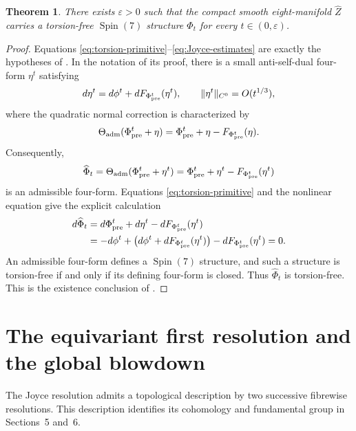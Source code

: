 \documentclass[11pt]{article}
\newtheorem{theorem}{Theorem}[section]
\theoremstyle{remark}\newtheorem{remark}[theorem]{Remark}
\newcommand{\SpinSeven}{\operatorname{Spin}(7)}
\begin{document}
\begin{theorem}\label{thm:Joyce-existence}
There exists $\varepsilon>0$ such that the compact smooth eight-manifold
$\widehat Z$ carries a torsion-free $\SpinSeven$ structure
$\widehat\Phi_t$ for every $t\in(0,\varepsilon)$.
\end{theorem}
\begin{proof}
Equations \eqref{eq:torsion-primitive}--\eqref{eq:Joyce-estimates} are
exactly the hypotheses of \cite[Theorem 13.6.1]{JoyceBook}.  In the notation
of its proof, there is a small anti-self-dual four-form $\eta^t$ satisfying
\[
 d\eta^t=d\phi^t+dF_{\Phi_{\rm pre}^t}(\eta^t),
 \qquad \|\eta^t\|_{C^0}=O(t^{1/3}),
\]
where the quadratic normal correction is characterized by
\[
 \Theta_{\rm adm}(\Phi_{\rm pre}^t+\eta)
 =\Phi_{\rm pre}^t+\eta-F_{\Phi_{\rm pre}^t}(\eta).
\]
Consequently,
\[
 \widehat\Phi_t=
 \Theta_{\rm adm}(\Phi_{\rm pre}^t+\eta^t)
 =\Phi_{\rm pre}^t+\eta^t-F_{\Phi_{\rm pre}^t}(\eta^t)
\]
is an admissible four-form.  Equations
\eqref{eq:torsion-primitive} and the nonlinear equation give the explicit
calculation
\begin{align*}
d\widehat\Phi_t
 &=d\Phi_{\rm pre}^t+d\eta^t
   -dF_{\Phi_{\rm pre}^t}(\eta^t)\\
 &=-d\phi^t+
   \bigl(d\phi^t+dF_{\Phi_{\rm pre}^t}(\eta^t)\bigr)
   -dF_{\Phi_{\rm pre}^t}(\eta^t)=0.
\end{align*}
An admissible four-form defines a $\SpinSeven$ structure, and such a
structure is torsion-free if and only if its defining four-form is closed.
Thus $\widehat\Phi_t$ is torsion-free.  This is the existence
conclusion of \cite[Theorem 13.6.2]{JoyceBook}.
\end{proof}

\section{The equivariant first resolution and the global blowdown}
The Joyce resolution admits a topological description by two successive
fibrewise resolutions.  This description identifies its cohomology and
fundamental group in Sections~5 and~6.
\end{document}
